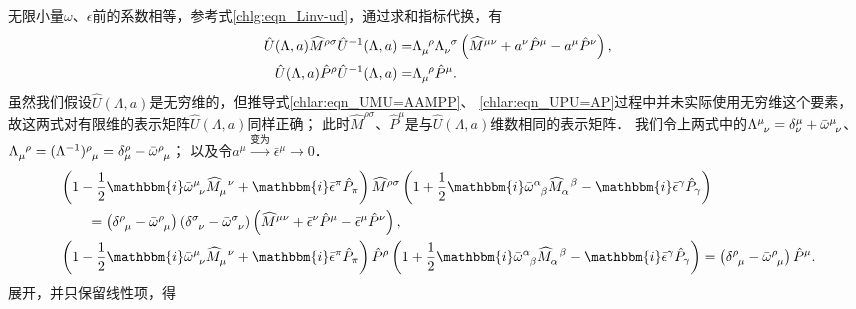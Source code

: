 无限小量$\omega$、$\epsilon$前的系数相等，参考式\eqref{chlg:eqn_Linv-ud}，通过求和指标代换，有
\begin{align}
	\hat{U}(\Lambda,a)\widehat{M}^{\rho\sigma} \hat{U}^{-1}(\Lambda,a) =&
	\Lambda_{\mu}^{\hphantom{\nu}\rho} \Lambda_{\nu}^{\hphantom{\nu}\sigma}\left( \widehat{M}^{\mu\nu}
	+ a^\nu  \hat{P}^{\mu}  - a^\mu  \hat{P}^{\nu}\right), \label{chlar:eqn_UMU=AAMPP}\\
	\hat{U}(\Lambda,a)\hat{P}^{\rho}\hat{U}^{-1}(\Lambda,a) =&
	\Lambda_{\mu}^{\hphantom{\nu}\rho}  \hat{P}^{\mu} . \label{chlar:eqn_UPU=AP}
\end{align}
虽然我们假设$\hat{U}(\Lambda,a)$是无穷维的，但推导式\eqref{chlar:eqn_UMU=AAMPP}、
\eqref{chlar:eqn_UPU=AP}过程中并未实际使用无穷维这个要素，
故这两式对有限维的表示矩阵$\hat{U}(\Lambda,a)$同样正确；
此时$\widehat{M}^{\rho\sigma}$、$\hat{P}^{\mu}$是与$\hat{U}(\Lambda,a)$维数相同的表示矩阵．
我们令上两式中的$\Lambda^\mu_{\hphantom{\nu}\nu}=\delta^\mu_{\nu}
+\bar{\omega}^\mu_{\hphantom{\nu}\nu}$、
$\Lambda_\mu^{\hphantom{\mu}\rho}=(\Lambda^{-1})^\rho_{\hphantom{\rho}\mu}
=\delta^\rho_{\mu}-\bar{\omega}^\rho_{\hphantom{\rho}\mu}$；
以及令$a^\mu\xrightarrow{\text{变为}}\bar{\epsilon}^\mu\to 0$．
\begin{align*}
	&\left(1-\frac{1}{2}\mathbbm{i} \bar{\omega}^\mu_{\hphantom{\nu}\nu}
	\widehat{M}^{\hphantom{\mu}\nu}_{\mu}+\mathbbm{i}\bar{\epsilon}^{\pi}\hat{P}_{\pi}\right)
	\widehat{M}^{\rho\sigma} \left(1+\frac{1}{2}\mathbbm{i} \bar{\omega}^\alpha_{\hphantom{\alpha}\beta}
	\widehat{M}^{\hphantom{\alpha}\beta}_{\alpha}-\mathbbm{i}\bar{\epsilon}^{\gamma}\hat{P}_{\gamma}\right) \\
	&\qquad =\left(\delta^\rho_{\hphantom{\rho}\mu} -\bar{\omega}^\rho_{\hphantom{\rho}\mu}\right)
	\left(\delta^\sigma_{\hphantom{\sigma}\nu} -\bar{\omega}^\sigma_{\hphantom{\sigma}\nu}\right)
	\left( \widehat{M}^{\mu\nu}+ \bar{\epsilon}^\nu  \hat{P}^{\mu}  - \bar{\epsilon}^\mu  \hat{P}^{\nu}\right), \\
	&\left(1-\frac{1}{2}\mathbbm{i} \bar{\omega}^\mu_{\hphantom{\nu}\nu}
	\widehat{M}^{\hphantom{\mu}\nu}_{\mu}+\mathbbm{i}\bar{\epsilon}^{\pi}\hat{P}_{\pi}\right)
	\hat{P}^{\rho} \left(1+\frac{1}{2}\mathbbm{i} \bar{\omega}^\alpha_{\hphantom{\alpha}\beta}
	\widehat{M}^{\hphantom{\alpha}\beta}_{\alpha}-\mathbbm{i}\bar{\epsilon}^{\gamma}\hat{P}_{\gamma}\right) 
	= \left(\delta^\rho_{\hphantom{\rho}\mu} -\bar{\omega}^\rho_{\hphantom{\rho}\mu}\right)\hat{P}^{\mu} . 
\end{align*}
展开，并只保留线性项，得
